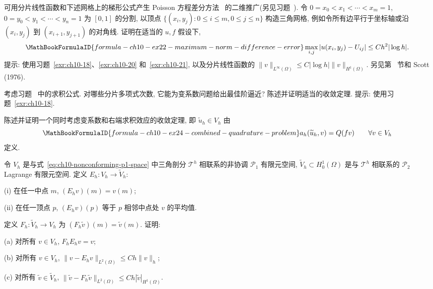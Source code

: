 \begin{MBExercise}
\label{exr:ch10-22}
可用分片线性函数和下述网格上的梯形公式产生 Poisson 方程差分方法~ 的二维推广(另见习题~). 令 $0=x_0<x_1<\cdots<x_m=1$, $0=y_0<y_1<\cdots<y_n=1$ 为 $[0,1]$ 的分割, 以顶点 $\{(x_i,y_j):0\leq i\leq m,0\leq j\leq n\}$ 构造三角网格, 例如令所有边平行于坐标轴或沿 $(x_i,y_j)$ 到 $(x_{i+1},y_{j+1})$ 的对角线. 证明在适当的 $u,f$ 假设下,
\[
\MathBookFormulaID{formula-ch10-ex22-maximum-norm-difference-error}
\max_{i,j}|u(x_i,y_j)-U_{ij}|\leq Ch^2|\log h|.
\]
提示: 使用习题~\ref{exr:ch10-18}、\ref{exr:ch10-20} 和~\ref{exr:ch10-21}, 以及分片线性函数的 $\|v\|_{L^\infty(\Omega)}\leq C|\log h|\|v\|_{H^1(\Omega)}$. 另见第~ 节和 Scott (1976).
\end{MBExercise}

\begin{MBExercise}
\label{exr:ch10-23}
考虑习题~ 中的求积公式. 对哪些分片多项式次数, 它能为变系数问题给出最佳阶逼近? 陈述并证明适当的收敛定理. 提示: 使用习题~\ref{exr:ch10-18}.
\end{MBExercise}

\begin{MBExercise}
\label{exr:ch10-24}
陈述并证明一个同时考虑变系数和右端求积效应的收敛定理, 即 $\widetilde u_h\in V_h$ 由
\[
\MathBookFormulaID{formula-ch10-ex24-combined-quadrature-problem}
a_h(\widetilde u_h,v)=Q(fv)\qquad\forall v\in V_h
\]
定义.
\end{MBExercise}

\begin{MBExercise}
\label{exr:ch10-25}
令 $V_h$ 是与式~\eqref{eq:ch10-nonconforming-p1-space} 中三角剖分 $\mathcal T^h$ 相联系的非协调 $\mathcal P_1$ 有限元空间, $\widetilde V_h\subset H_0^1(\Omega)$ 是与 $\mathcal T^h$ 相联系的 $\mathcal P_2$ Lagrange 有限元空间. 定义 $E_h:V_h\to\widetilde V_h$:

(i) 在任一中点 $m$, $(E_hv)(m)=v(m)$;

(ii) 在任一顶点 $p$, $(E_hv)(p)$ 等于 $p$ 相邻中点处 $v$ 的平均值.

定义 $F_h:\widetilde V_h\to V_h$ 为 $(F_h\widetilde v)(m)=\widetilde v(m)$. 证明:

(a) 对所有 $v\in V_h$, $F_hE_hv=v$;

(b) 对所有 $v\in V_h$, $\|v-E_hv\|_{L^2(\Omega)}\leq Ch\|v\|_h$;

(c) 对所有 $\widetilde v\in\widetilde V_h$, $\|\widetilde v-F_h\widetilde v\|_{L^2(\Omega)}\leq Ch|\widetilde v|_{H^1(\Omega)}$.
\end{MBExercise}

